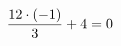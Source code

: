 \documentclass[preview]{standalone}
\begin{document}
\begin{align*}
\special{dvisvgm:raw <g id='unique000'>}\frac{12 \cdot (-1)}{3} + 4 = 0\special{dvisvgm:raw </g>}
\end{align*}
\end{document}
